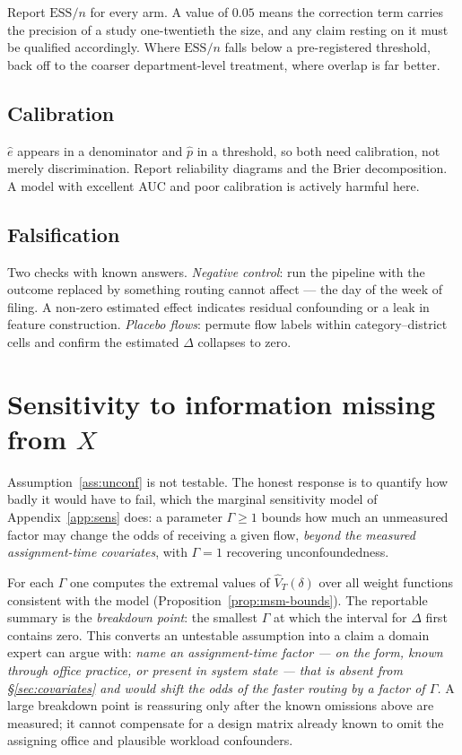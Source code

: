 \documentclass[11pt,a4paper]{article}
\theoremstyle{plain}
\theoremstyle{definition}
\theoremstyle{remark}
\begin{document}
Report $\text{ESS}/n$ for every arm. A value of $0.05$ means the correction term carries the
precision of a study one-twentieth the size, and any claim resting on it must be qualified
accordingly. Where $\text{ESS}/n$ falls below a pre-registered threshold, back off to the
coarser department-level treatment, where overlap is far better.

\subsection{Calibration}

$\hat e$ appears in a denominator and $\hat p$ in a threshold, so both need calibration, not
merely discrimination. Report reliability diagrams and the Brier decomposition. A model with
excellent AUC and poor calibration is actively harmful here.

\subsection{Falsification}

Two checks with known answers. \emph{Negative control}: run the pipeline with the outcome
replaced by something routing cannot affect --- the day of the week of filing. A non-zero
estimated effect indicates residual confounding or a leak in feature construction.
\emph{Placebo flows}: permute flow labels within category--district cells and confirm the
estimated $\Delta$ collapses to zero.

\section{Sensitivity to information missing from \texorpdfstring{$X$}{X}}\label{sec:sens}

Assumption~\ref{ass:unconf} is not testable. The honest response is to quantify how badly it
would have to fail, which the marginal sensitivity model of Appendix~\ref{app:sens} does: a
parameter $\Gamma\ge1$ bounds how much an unmeasured factor may change the odds of receiving a
given flow, \emph{beyond the measured assignment-time covariates}, with $\Gamma=1$ recovering
unconfoundedness.

For each $\Gamma$ one computes the extremal values of $\hat V_T(\delta)$ over all weight
functions consistent with the model (Proposition~\ref{prop:msm-bounds}). The reportable summary
is the \emph{breakdown point}: the smallest $\Gamma$ at which the interval for $\Delta$ first
contains zero. This converts an untestable assumption into a claim a domain expert can argue
with: \emph{name an assignment-time factor --- on the form, known through office practice, or
present in system state --- that is absent from \S\ref{sec:covariates} and would shift the odds
of the faster routing by a factor of $\Gamma$.} A large breakdown point is reassuring only after
the known omissions above are measured; it cannot compensate for a design matrix already known
to omit the assigning office and plausible workload confounders.
\end{document}
